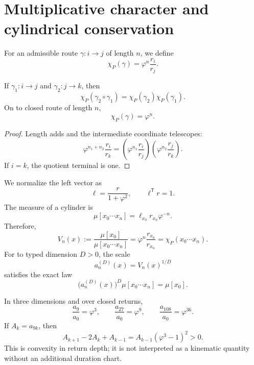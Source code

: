 \section{Multiplicative character and cylindrical conservation}

For an admissible route \(\gamma:i\to j\) of length \(n\), we define
\begin{equation}
 \chi_P(\gamma)=\varphi^n\frac{r_i}{r_j}.
 \label{gfp:b:eq:caracter-parry-phi}
\end{equation}

\begin{proposition}
\label{gfp:b:prop:multiplicatividad-parry-phi}
If \(\gamma_1:i\to j\) and \(\gamma_2:j\to k\), then
\[
 \chi_P(\gamma_2\circ\gamma_1)
 =\chi_P(\gamma_2)\chi_P(\gamma_1).
\]
On to closed route of length \(n\),
\[
 \chi_P(\gamma)=\varphi^n.
\]
\end{proposition}

\begin{proof}
Length adds and the intermediate coordinate telescopes:
\[
 \varphi^{n_1+n_2}\frac{r_i}{r_k}
 =\left(\varphi^{n_1}\frac{r_i}{r_j}\right)
  \left(\varphi^{n_2}\frac{r_j}{r_k}\right).
\]
If \(i=k\), the quotient terminal is one.
\end{proof}

We normalize the left vector as
\[
 \ell=\frac{r}{1+\varphi^2},
 \qquad
 \ell^{\mathsf T}r=1.
\]
The measure of a cylinder is
\[
 \mu[x_0\cdots x_n]
 =\ell_{x_0}r_{x_n}\varphi^{-n}.
\]
Therefore,
\begin{equation}
 V_n(x)
 :=\frac{\mu[x_0]}{\mu[x_0\cdots x_n]}
 =\varphi^n\frac{r_{x_0}}{r_{x_n}}
 =\chi_P(x_0\cdots x_n).
 \label{gfp:b:eq:volumen-cilindrico-phi}
\end{equation}
For to typed dimension \(D>0\), the scale
\[
 a_n^{(D)}(x)=V_n(x)^{1/D}
\]
satisfies the exact law
\begin{equation}
 \boxed{
 \bigl(a_n^{(D)}(x)\bigr)^D
 \mu[x_0\cdots x_n]=\mu[x_0].}
 \label{gfp:b:eq:conservacion-cilindrica-phi}
\end{equation}

In three dimensions and over closed returns,
\[
 \frac{a_9}{a_0}=\varphi^3,
 \qquad
 \frac{a_{27}}{a_0}=\varphi^9,
 \qquad
 \frac{a_{108}}{a_0}=\varphi^{36}.
\]
If \(A_k=a_{9k}\), then
\begin{equation}
 A_{k+1}-2A_k+A_{k-1}
 =A_{k-1}(\varphi^3-1)^2>0.
 \label{gfp:b:eq:convexidad-retornos-phi}
\end{equation}
This is convexity in return depth; it is not interpreted as a
kinematic quantity without an additional duration chart.

